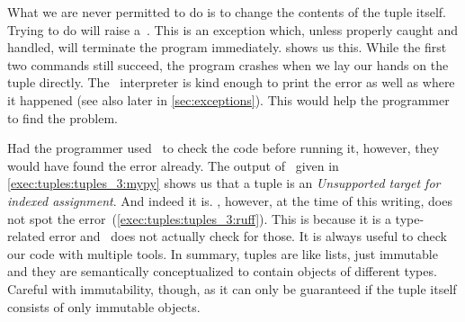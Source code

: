 What we are never permitted to do is to change the contents of the tuple itself.
Trying to do  will raise a~.
This is an exception which, unless properly caught and handled, will terminate the program immediately.
 shows us this.
While the first two  commands still succeed, the program crashes when we lay our hands on the tuple directly.
The \python\ interpreter is kind enough to print the error as well as where it happened (see also later in \cref{sec:exceptions}).
This would help the programmer to find the problem.

Had the programmer used \mypy\ to check the code before running it, however, they would have found the error already.
The output of \mypy\ given in \cref{exec:tuples:tuples_3:mypy} shows us that a tuple is an \emph{Unsupported target for indexed assignment}.
And indeed it is.
\ruff, however, at the time of this writing, does not spot the error~(\cref{exec:tuples:tuples_3:ruff}).
This is because it is a type-related error and \ruff\ does not actually check for those.
It is always useful to check our code with multiple tools.%
%
In summary, tuples are like lists, just immutable and they are semantically conceptualized to contain objects of different types.
Careful with immutability, though, as it can only be guaranteed if the tuple itself consists of only immutable objects.%
%
\FloatBarrier%
\endhsection%
%
